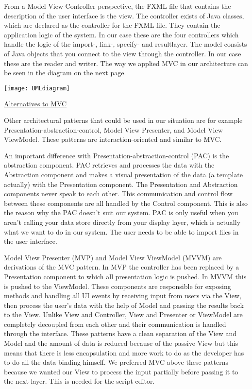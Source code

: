 \documentclass[a4paper,english,fleqn]{exam}
\begin{document}
From a Model View Controller perspective, the FXML file that contains the description of the user interface is the view. The controller exists of Java classes, which are declared as the controller for the FXML file. They contain the application logic of the system. In our case these are the four controllers which handle the logic of the import-, link-, specify- and resultlayer. The model consists of Java objects that you connect to the view through the controller. In our case these are the reader and writer. The way we applied MVC in our architecture can be seen in the diagram on the next page.

\texttt{[image: UMLdiagram]}

\newpage



\underline{Alternatives to MVC}

Other architectural patterns that could be used in our situation are for example Presentation-abstraction-control, Model View Presenter, and Model View ViewModel. These patterns are interaction-oriented and similar to MVC. 

An important difference with Presentation-abstraction-control (PAC) is the abstraction component. PAC retrieves and processes the data with the Abstraction component and makes a visual presentation of the data (a template actually) with the Presentation component. The Presentation and Abstraction components never speak to each other. This communication and control flow between these components are all handled by the Control component. This is also the reason why the PAC doesn't suit our system. PAC is only useful when you aren't calling your data store directly from your display layer, which is actually what we want to do in our system. The user needs to be able to import files in the user interface. 

Model View Presenter (MVP) and Model View ViewModel (MVVM) are derivations of the MVC pattern. In MVP the controller has been replaced by a Presentation component to which all presentation logic is pushed. In MVVM this is pushed to the ViewModel. These components are responsible for exposing methods and handling all UI events by receiving input from users via the View, then process the user's data with the help of Model and passing the results back to the View. Unlike View and Controller, View and Presenter or ViewModel are completely decoupled from each other and their communication is handled through the interface. These patterns have a clean separation of the View and Model and the amount of data is reduced because of the passive View but this means that there is less encapsulation and more work to do as the developer has to do all the data binding himself. We preferred MVC above these patterns because we wanted our View to process the input partially before passing it to the next layer. This is needed for the script editor.
\end{document}
